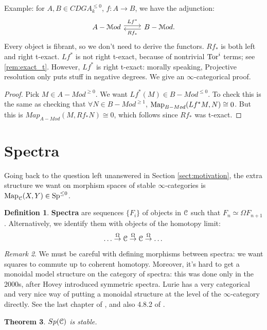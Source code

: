 \documentclass[10pt,a4paper,reqno,oneside]{book} %
\theoremstyle{plain}
\newtheorem{thm}{Theorem}[section]
\theoremstyle{definition}
\newtheorem{defin}[thm]{Definition}
\theoremstyle{remark}
\newtheorem{rem}[thm]{Remark}
\numberwithin{equation}{section}
\begin{document}
Example: for $A,B \in CDGA_k^{\leq 0}$, $f:A \to B$, we have the adjunction:
\[
\begin{tikzcd}
A-\cM od\arrow[shift left]{r}{Lf^*} & B-\cM od\arrow[shift left]{l}{Rf_*}.
\end{tikzcd}
\] 
Every object is fibrant, so we don't need to
derive the functors. $Rf_*$ is both left and right t-exact. $Lf^*$ is not right t-exact, because of nontrivial $\mathrm{Tor}^i$
terms; see \ref{rem:exact_t}. However, $Lf^*$ is right t-exact: morally speaking, Projective resolution only puts stuff in negative degrees. We give an $\infty$-categorical proof.
\begin{proof}
Pick $M \in A-Mod^{\geq 0}$. We want $Lf^*(M) \in B-Mod^{\leq 0}$. To check this is the same as checking that
$\forall N \in B-Mod^{\geq 1}$, $\operatorname{Map}_{B-Mod}(Lf^*M,N) \cong 0$. But this is $Map_{A-Mod}(M,Rf_*N) \cong 0$, which
follows since $Rf_*$ was t-exact.
\end{proof}


\section{Spectra}
\label{sect:spectra}

Going back to the question left unanswered in Section \ref{sect:motivation}, the extra structure we want on
morphism spaces of stable $\infty$-categories is $\operatorname{Map}_{\mathcal C}(X,Y) \in \operatorname{Sp}^{\leq 0}$.

\begin{defin}
\textbf{Spectra} are sequences $\{F_i\}$ of objects in $\mathcal C$ such that $F_n \simeq \Omega F_{n+1}$. Alternatively,
we identify them with objects of the homotopy limit:
\[	\dots \overset{\Omega}{\to} \mathcal C \overset{\Omega}{\to} \mathcal C \overset{\Omega}{\to} \dots	\]
\end{defin}

\begin{rem}
We must be careful with defining morphisms between spectra: we want squares to commute up to coherent homotopy.
Moreover, it's hard to get a monoidal model structure on the category of spectra: this was done only in the 2000s, after Hovey 
introduced symmetric spectra. Lurie has a very categorical and very nice way of putting a monoidal structure 
at the level of the $\infty$-category
directly. See the last chapter of \cite{Groth}, and also 4.8.2 of \cite{Lurie_Higher_algebra}.
\end{rem}

\begin{thm}
$Sp(\mathcal C)$ is stable.
\end{thm}
\end{document}
